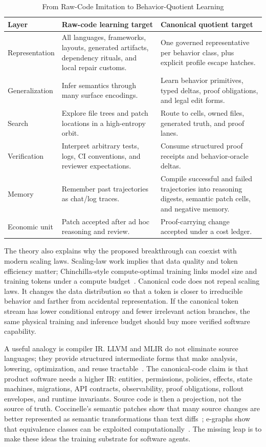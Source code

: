 \begin{table}[t]
\caption{From Raw-Code Imitation to Behavior-Quotient Learning}
\label{tab:quotient}
\centering
\footnotesize
\begin{tabularx}{\textwidth}{p{}X X}
\toprule
Layer & Raw-code learning target & Canonical quotient target \\
\midrule
Representation & All languages, frameworks, layouts, generated artifacts, dependency rituals, and local repair customs. & One governed representative per behavior class, plus explicit profile escape hatches. \\
Generalization & Infer semantics through many surface encodings. & Learn behavior primitives, typed deltas, proof obligations, and legal edit forms. \\
Search & Explore file trees and patch locations in a high-entropy orbit. & Route to cells, owned files, generated truth, and proof lanes. \\
Verification & Interpret arbitrary tests, logs, CI conventions, and reviewer expectations. & Consume structured proof receipts and behavior-oracle deltas. \\
Memory & Remember past trajectories as chat/log traces. & Compile successful and failed trajectories into reasoning digests, semantic patch cells, and negative memory. \\
Economic unit & Patch accepted after ad hoc reasoning and review. & Proof-carrying change accepted under a cost ledger. \\
\bottomrule
\end{tabularx}
\end{table}

The theory also explains why the proposed breakthrough can coexist with modern scaling laws. Scaling-law work implies that data quality and token efficiency matter; Chinchilla-style compute-optimal training links model size and training tokens under a compute budget~\cite{hoffmannChinchilla}. Canonical code does not repeal scaling laws. It changes the data distribution so that a token is closer to irreducible behavior and farther from accidental representation. If the canonical token stream has lower conditional entropy and fewer irrelevant action branches, the same physical training and inference budget should buy more verified software capability.

A useful analogy is compiler IR. LLVM and MLIR do not eliminate source languages; they provide structured intermediate forms that make analysis, lowering, optimization, and reuse tractable~\cite{lattnerLLVM,lattnerMLIR}. The canonical-code claim is that product software needs a higher IR: entities, permissions, policies, effects, state machines, migrations, API contracts, observability, proof obligations, rollout envelopes, and runtime invariants. Source code is then a projection, not the source of truth. Coccinelle's semantic patches show that many source changes are better represented as semantic transformations than text diffs~\cite{coccinelle}; e-graphs show that equivalence classes can be exploited computationally~\cite{eggEgraphs}. The missing leap is to make these ideas the training substrate for software agents.

